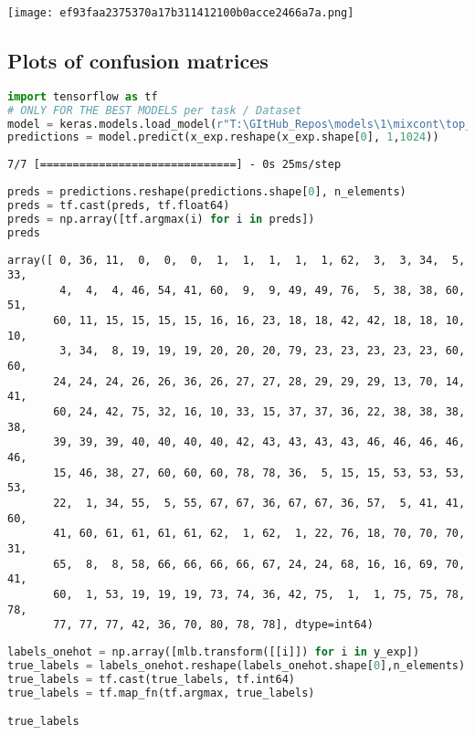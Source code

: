 \texttt{[image: ef93faa2375370a17b311412100b0acce2466a7a.png]}

\hypertarget{plots-of-confusion-matrices}{%
\subsection{Plots of confusion
matrices}\label{plots-of-confusion-matrices}}

\begin{lstlisting}[language=Python]
import tensorflow as tf
# ONLY FOR THE BEST MODELS per task / Dataset
model = keras.models.load_model(r"T:\GItHub_Repos\models\1\mixcont\top_layer\models\simple_cnn_dct_top_layer.h5")
predictions = model.predict(x_exp.reshape(x_exp.shape[0], 1,1024))
\end{lstlisting}

\begin{lstlisting}
7/7 [==============================] - 0s 25ms/step
\end{lstlisting}

\begin{lstlisting}[language=Python]
preds = predictions.reshape(predictions.shape[0], n_elements)
preds = tf.cast(preds, tf.float64)
preds = np.array([tf.argmax(i) for i in preds])
preds
\end{lstlisting}

\begin{lstlisting}
array([ 0, 36, 11,  0,  0,  0,  1,  1,  1,  1,  1, 62,  3,  3, 34,  5, 33,
        4,  4,  4, 46, 54, 41, 60,  9,  9, 49, 49, 76,  5, 38, 38, 60, 51,
       60, 11, 15, 15, 15, 15, 16, 16, 23, 18, 18, 42, 42, 18, 18, 10, 10,
        3, 34,  8, 19, 19, 19, 20, 20, 20, 79, 23, 23, 23, 23, 23, 60, 60,
       24, 24, 24, 26, 26, 36, 26, 27, 27, 28, 29, 29, 29, 13, 70, 14, 41,
       60, 24, 42, 75, 32, 16, 10, 33, 15, 37, 37, 36, 22, 38, 38, 38, 38,
       39, 39, 39, 40, 40, 40, 40, 42, 43, 43, 43, 43, 46, 46, 46, 46, 46,
       15, 46, 38, 27, 60, 60, 60, 78, 78, 36,  5, 15, 15, 53, 53, 53, 53,
       22,  1, 34, 55,  5, 55, 67, 67, 36, 67, 67, 36, 57,  5, 41, 41, 60,
       41, 60, 61, 61, 61, 61, 62,  1, 62,  1, 22, 76, 18, 70, 70, 70, 31,
       65,  8,  8, 58, 66, 66, 66, 66, 67, 24, 24, 68, 16, 16, 69, 70, 41,
       60,  1, 53, 19, 19, 19, 73, 74, 36, 42, 75,  1,  1, 75, 75, 78, 78,
       77, 77, 77, 42, 36, 70, 80, 78, 78], dtype=int64)
\end{lstlisting}

\begin{lstlisting}[language=Python]
labels_onehot = np.array([mlb.transform([[i]]) for i in y_exp])
true_labels = labels_onehot.reshape(labels_onehot.shape[0],n_elements)
true_labels = tf.cast(true_labels, tf.int64)
true_labels = tf.map_fn(tf.argmax, true_labels)

true_labels
\end{lstlisting}

